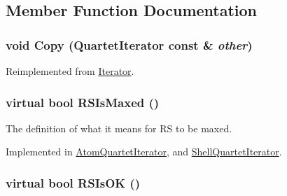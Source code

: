 \subsection{Member Function Documentation}
\hypertarget{classJKBuilder_1_1QuartetIterator_a1cc9d53b063e002ead95abb45f05f0c3}{
\subsubsection[{Copy}]{\setlength{\rightskip}{0pt plus 5cm}void Copy ({\bf QuartetIterator} const \& {\em other})}}
\label{classJKBuilder_1_1QuartetIterator_a1cc9d53b063e002ead95abb45f05f0c3}


Reimplemented from \hyperlink{classJKBuilder_1_1Iterator_aacb7559eb1b8aab6e7bb6a56602d97ff}{Iterator}.\hypertarget{classJKBuilder_1_1QuartetIterator_af88c46759ac710bbd36c17601dc62d55}{
\subsubsection[{RSIsMaxed}]{\setlength{\rightskip}{0pt plus 5cm}virtual bool RSIsMaxed ()}}
\label{classJKBuilder_1_1QuartetIterator_af88c46759ac710bbd36c17601dc62d55}


The definition of what it means for RS to be maxed. 

Implemented in \hyperlink{classJKBuilder_1_1AtomQuartetIterator_a458dcf49c4c4bbb1e3d3d39d3dc086c9}{AtomQuartetIterator}, and \hyperlink{classJKBuilder_1_1ShellQuartetIterator_a458dcf49c4c4bbb1e3d3d39d3dc086c9}{ShellQuartetIterator}.\hypertarget{classJKBuilder_1_1QuartetIterator_ac51ff9a02f4a201598f7820476c52faf}{
\subsubsection[{RSIsOK}]{\setlength{\rightskip}{0pt plus 5cm}virtual bool RSIsOK ()}}
\label{classJKBuilder_1_1QuartetIterator_ac51ff9a02f4a201598f7820476c52faf}


